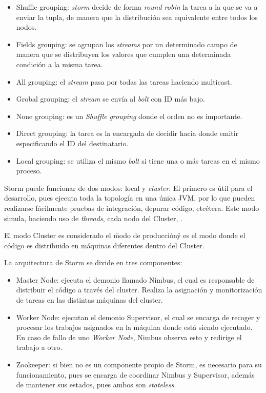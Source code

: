 \begin{itemize}
\item Shuffle grouping: \textit{storm} decide de forma \textit{round robin} la tarea a la que se va a enviar la tupla, de manera que la distribución sea equivalente entre todos los nodos.
\item Fields grouping: se agrupan los \textit{streams} por un determinado campo de manera que se distribuyen los valores que cumplen una determinada condición a la misma tarea.
\item All grouping: el \textit{stream} pasa por todas las tareas haciendo multicast.
\item Grobal grouping: el \textit{stream} se envía al \textit{bolt} con ID más bajo.
\item None grouping: es un \textit{Shuffle grouping} donde el orden no es importante.
\item Direct grouping: la tarea es la encargada de decidir hacia donde emitir especificando el ID del destinatario.
\item Local grouping: se utiliza el mismo \textit{bolt} si tiene una o más tareas en el mismo proceso.
\end{itemize}

Storm puede funcionar de dos modos: local y \textit{cluster}. El primero es útil para el desarrollo, pues ejecuta toda la topología en una única JVM, por lo que pueden realizarse fácilmente pruebas de integración, depurar código, etcétera. Este modo simula, haciendo uso de \textit{threads}, cada nodo del Cluster, \cite{Storm}.

El modo Cluster es considerado el \"modo de producción\" y es el modo donde el código es distribuido en máquinas diferentes dentro del Cluster.

La arquitectura de Storm se divide en tres componentes:
\begin{itemize}
\item Master Node: ejecuta el demonio llamado Nimbus, el cual es responsable de distribuir el código a través del cluster. Realiza la asignación y monitorización de tareas en las distintas máquinas del cluster.
\item Worker Node: ejecutan el demonio Supervisor, el cual se encarga de recoger y procesar los trabajos asignados en la máquina donde está siendo ejecutado. En caso de fallo de uno \textit{Worker Node}, Nimbus observa esto y redirige el trabajo a otro.
\item Zookeeper: si bien no es un componente propio de Storm, es necesario para su funcionamiento, pues se encarga de coordinar Nimbus y Supervisor, además de mantener sus estados, pues ambos son \textit{stateless}.
\end{itemize}

